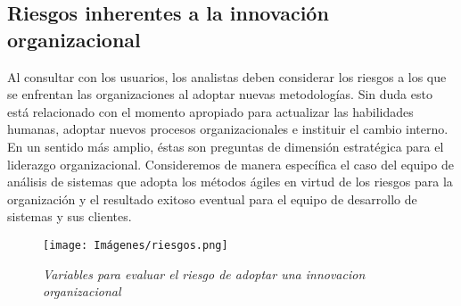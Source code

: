 \subsection{Riesgos inherentes a la innovación organizacional }
Al consultar con los usuarios, los analistas deben considerar los riesgos a los que se enfrentan las organizaciones al adoptar nuevas metodologías. Sin duda esto está relacionado con el momento apropiado para actualizar las habilidades humanas, adoptar nuevos procesos organizacionales e instituir el cambio interno. En un sentido más amplio, éstas son preguntas de dimensión estratégica para el liderazgo organizacional. Consideremos de manera específica el caso del equipo de análisis de sistemas que adopta los métodos ágiles en virtud de los riesgos para la organización y el resultado exitoso eventual para el equipo de desarrollo de sistemas y sus clientes.
    
\begin{figure}[h!]
    \centering
    \texttt{[image: Imágenes/riesgos.png]}
    \caption{\textit{Variables para evaluar el riesgo de adoptar una innovacion organizacional}}
    \label{exemploLabel}
    \end{figure}  
    
